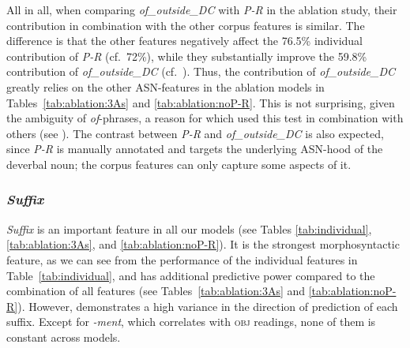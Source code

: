 \documentclass[output=paper]{langsci/langscibook}
\begin{document}
All in all, when comparing \textit{of\_outside\_DC} with \textit{P-R} in the ablation study, their contribution in combination with the other corpus features is similar.  {The difference is that the other features negatively affect the  76.5\% individual contribution  of \textit{P-R} (cf.\ 72\%), while they substantially improve the 59.8\% contribution of \textit{of\_outside\_DC} (cf.\ ).} Thus, the  contribution of \textit{of\_outside\_DC}  greatly relies on the other ASN-features in the ablation models in Tables~\ref{tab:ablation:3As} and \ref{tab:ablation:noP-R}. This is not surprising, given the ambiguity of \textit{of}-phrases, a reason for which \cite{grimshaw:90} used this test in combination with others (see ). The contrast between \textit{P-R} and \textit{of\_outside\_DC} is also expected, since \textit{P-R} is manually annotated and targets the underlying ASN-hood of the deverbal noun; the corpus features can only capture some aspects of it.






\subsubsection{\textit{Suffix}}\label{sec:gia:discussion-int-suffix}
\textit{Suffix} is an important feature in all our models (see Tables \ref{tab:individual}, \ref{tab:ablation:3As}, and \ref{tab:ablation:noP-R}).  {It is the strongest morphosyntactic feature, as we can see from the performance of the individual features in Table~\ref{tab:individual}, and has additional predictive power compared to the combination of all features}  {(see Tables~\ref{tab:ablation:3As} and \ref{tab:ablation:noP-R}).} However,  demonstrates a high variance in the direction of prediction of each suffix.  {Except for \textit{-ment}, which correlates with \textsc{obj} readings,} none of them is constant across models. 
\end{document}
